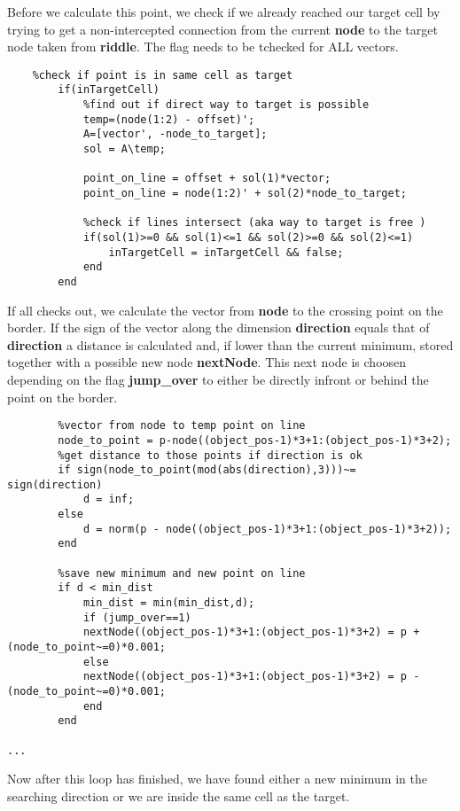 Before we calculate this point, we check if we already reached our target cell by trying to get a non-intercepted connection from the current \textbf{node} to the target node taken from \textbf{riddle}. The flag needs to be tchecked for ALL vectors.       
\begin{lstlisting}
    %check if point is in same cell as target
        if(inTargetCell)
            %find out if direct way to target is possible
            temp=(node(1:2) - offset)';
            A=[vector', -node_to_target];
            sol = A\temp;
            
            point_on_line = offset + sol(1)*vector;
            point_on_line = node(1:2)' + sol(2)*node_to_target;
            
            %check if lines intersect (aka way to target is free )
            if(sol(1)>=0 && sol(1)<=1 && sol(2)>=0 && sol(2)<=1)
                inTargetCell = inTargetCell && false;
            end    
        end
\end{lstlisting}
If all checks out, we calculate the vector from \textbf{node} to the crossing point on the border. If the sign of the vector along the dimension \textbf{direction} equals that of \textbf{direction} a distance is calculated and, if lower than the current minimum, stored together with a possible new node \textbf{nextNode}.
This next node is choosen depending on the flag \textbf{jump\_over} to either be directly infront or behind the point on the border.
\begin{lstlisting}
        %vector from node to temp point on line
        node_to_point = p-node((object_pos-1)*3+1:(object_pos-1)*3+2);
        %get distance to those points if direction is ok
        if sign(node_to_point(mod(abs(direction),3)))~= sign(direction)
            d = inf;
        else
            d = norm(p - node((object_pos-1)*3+1:(object_pos-1)*3+2));
        end
        
        %save new minimum and new point on line
        if d < min_dist
            min_dist = min(min_dist,d);
            if (jump_over==1)
            nextNode((object_pos-1)*3+1:(object_pos-1)*3+2) = p + (node_to_point~=0)*0.001;
            else
            nextNode((object_pos-1)*3+1:(object_pos-1)*3+2) = p - (node_to_point~=0)*0.001;
            end
        end
        
...
\end{lstlisting}
Now after this loop has finished, we have found either a new minimum in the searching direction or we are inside the same cell as the target. \\
